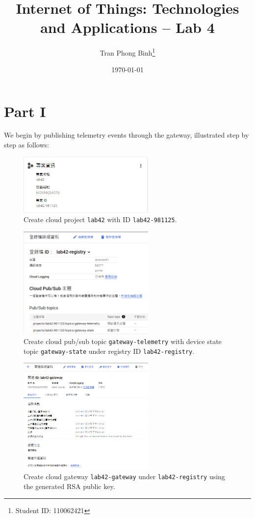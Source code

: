 \documentclass[12pt, a4paper, onside]{article}
\title{\textbf{Internet of Things: Technologies and Applications -- Lab 4}}
\author{Tran Phong Binh\thanks{Student ID: 110062421}}
\affil{Department of Computer Science, National Tsing Hua University}
\date{\today}
\begin{document}
\maketitle

\section{Part I}
We begin by publishing telemetry events through the gateway, illustrated step by step as follows:
\begin{figure}[h]
  \centering
  \includegraphics[width=0.6\textwidth]{img/1_cloud_create_project}
  \caption{Create cloud project \texttt{lab42} with ID \texttt{lab42-981125}.}
\end{figure}

\begin{figure}[h]
  \centering
  \includegraphics[width=0.6\textwidth]{img/2_cloud_pubsub_topics}
  \caption{Create cloud pub/sub topic \texttt{gateway-telemetry} with device state topic \texttt{gateway-state} under registry ID \texttt{lab42-registry}.}
\end{figure}

\begin{figure}[h]
  \centering
  \includegraphics[width=0.6\textwidth]{img/3_cloud_gateway}
  \caption{Create cloud gateway \texttt{lab42-gateway} under \texttt{lab42-registry} using the generated RSA public key.}
\end{figure}
\end{document}
